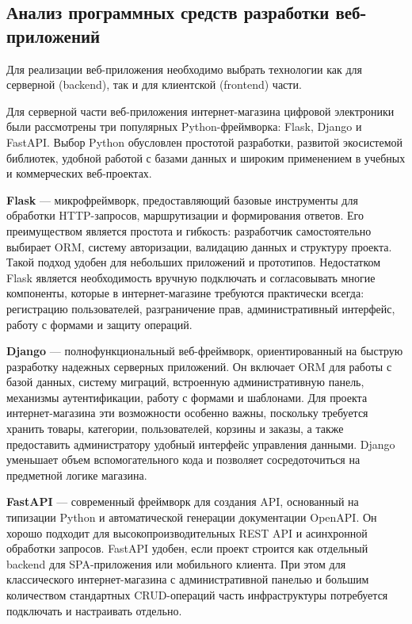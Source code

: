 \subsection{Анализ программных средств разработки веб-приложений}

Для реализации веб-приложения необходимо выбрать технологии как для серверной (backend), так и для клиентской (frontend) части.

Для серверной части веб-приложения интернет-магазина цифровой электроники были рассмотрены три популярных Python-фреймворка: Flask, Django и FastAPI. Выбор Python обусловлен простотой разработки, развитой экосистемой библиотек, удобной работой с базами данных и широким применением в учебных и коммерческих веб-проектах.

\textbf{Flask} --- микрофреймворк, предоставляющий базовые инструменты для обработки HTTP-запросов, маршрутизации и формирования ответов. Его преимуществом является простота и гибкость: разработчик самостоятельно выбирает ORM, систему авторизации, валидацию данных и структуру проекта. Такой подход удобен для небольших приложений и прототипов. Недостатком Flask является необходимость вручную подключать и согласовывать многие компоненты, которые в интернет-магазине требуются практически всегда: регистрацию пользователей, разграничение прав, административный интерфейс, работу с формами и защиту операций.

\textbf{Django} --- полнофункциональный веб-фреймворк, ориентированный на быструю разработку надежных серверных приложений. Он включает ORM для работы с базой данных, систему миграций, встроенную административную панель, механизмы аутентификации, работу с формами и шаблонами. Для проекта интернет-магазина эти возможности особенно важны, поскольку требуется хранить товары, категории, пользователей, корзины и заказы, а также предоставить администратору удобный интерфейс управления данными. Django уменьшает объем вспомогательного кода и позволяет сосредоточиться на предметной логике магазина.

\textbf{FastAPI} --- современный фреймворк для создания API, основанный на типизации Python и автоматической генерации документации OpenAPI. Он хорошо подходит для высокопроизводительных REST API и асинхронной обработки запросов. FastAPI удобен, если проект строится как отдельный backend для SPA-приложения или мобильного клиента. При этом для классического интернет-магазина с административной панелью и большим количеством стандартных CRUD-операций часть инфраструктуры потребуется подключать и настраивать отдельно.

